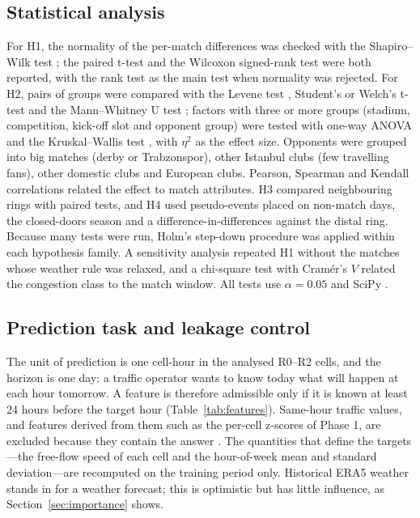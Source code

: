 \documentclass[conference]{IEEEtran}
\begin{document}
\subsection{Statistical analysis}
For H1, the normality of the per-match differences was checked with the Shapiro--Wilk test \cite{shapiro1965}; the paired t-test and the Wilcoxon signed-rank test \cite{wilcoxon1945} were both reported, with the rank test as the main test when normality was rejected. For H2, pairs of groups were compared with the Levene test \cite{levene1960}, Student's or Welch's t-test \cite{welch1947} and the Mann--Whitney U test \cite{mann1947}; factors with three or more groups (stadium, competition, kick-off slot and opponent group) were tested with one-way ANOVA and the Kruskal--Wallis test \cite{kruskal1952}, with $\eta^2$ as the effect size. Opponents were grouped into big matches (derby or Trabzonspor), other Istanbul clubs (few travelling fans), other domestic clubs and European clubs. Pearson, Spearman and Kendall correlations related the effect to match attributes. H3 compared neighbouring rings with paired tests, and H4 used pseudo-events placed on non-match days, the closed-doors season and a difference-in-differences against the distal ring. Because many tests were run, Holm's step-down procedure \cite{holm1979} was applied within each hypothesis family. A sensitivity analysis repeated H1 without the matches whose weather rule was relaxed, and a chi-square test with Cramér's $V$ \cite{cramer1946} related the congestion class to the match window. All tests use $\alpha=0.05$ and SciPy \cite{scipy}.

\subsection{Prediction task and leakage control}
The unit of prediction is one cell-hour in the analysed R0--R2 cells, and the horizon is one day: a traffic operator wants to know today what will happen at each hour tomorrow. A feature is therefore admissible only if it is known at least 24 hours before the target hour (Table~\ref{tab:features}). Same-hour traffic values, and features derived from them such as the per-cell z-scores of Phase 1, are excluded because they contain the answer \cite{kaufman2012}. The quantities that define the targets---the free-flow speed of each cell and the hour-of-week mean and standard deviation---are recomputed on the training period only. Historical ERA5 weather stands in for a weather forecast; this is optimistic but has little influence, as Section~\ref{sec:importance} shows.
\end{document}
